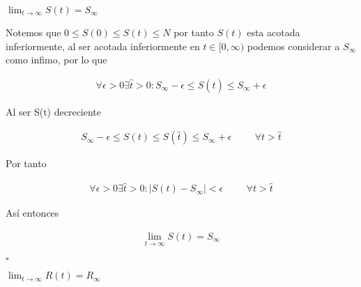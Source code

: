 \begin{Af}
$\lim_{t \to \infty} S(t) = S_{\infty}$
\end{Af}

\begin{Dem}
Notemos que  $0 \leq S(0) \leq S(t) \leq N$ por tanto $S(t)$ esta acotada inferiormente, al ser acotada inferiormente en $t \in [0, \infty)$ podemos considerar a $S_{\infty}$ como infimo, por lo que
 
\begin{align*}
\forall \epsilon >0  \exists \hat{t} > 0 : S_{\infty} - \epsilon \leq S(\hat{t}) \leq S_{\infty} +  \epsilon
\end{align*}
 
Al ser S(t) decreciente 

\begin{align*}
S_{\infty} - \epsilon \leq S(t) \leq S(\hat{t}) \leq S_{\infty} +  \epsilon  \hspace{1cm} \forall t  > \hat{t} 
\end{align*}

Por tanto 

\begin{align*}
\forall \epsilon > 0  \exists \hat{t} > 0 : |S(t) -  S_{\infty}| <  \epsilon \hspace{1cm} \forall t  > \hat{t} 
\end{align*}

Así entonces

\begin{align*}
\lim_{t \to \infty} S(t) = S_{\infty}
\end{align*}

\end{Dem}

\hfill	$\square$

\begin{Af}
$\lim_{t \to \infty} R(t) = R_{\infty}$
\end{Af}

